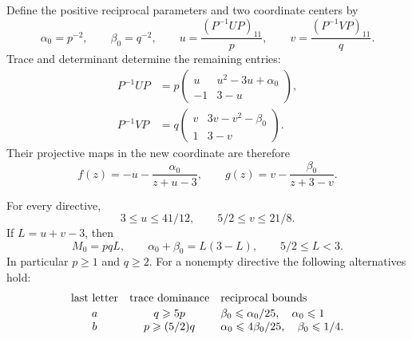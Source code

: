 Define the positive reciprocal parameters and two coordinate centers by
$$
 \alpha_0=p^{-2},\qquad\beta_0=q^{-2},\qquad
 u=\frac{(P^{-1}UP)_{11}}p,\qquad
 v=\frac{(P^{-1}VP)_{11}}q.
$$
Trace and determinant determine the remaining entries:
\begin{equation}\label{eq:decoder-cusp-matrices}
 \begin{split}
 P^{-1}UP&=
 p\begin{pmatrix}u&u^2-3u+\alpha_0\\-1&3-u\end{pmatrix},\\
 P^{-1}VP&=
 q\begin{pmatrix}v&3v-v^2-\beta_0\\1&3-v\end{pmatrix}.
 \end{split}
\end{equation}
Their projective maps in the new coordinate are therefore
\begin{equation}\label{eq:decoder-fg}
 f(z)=-u-\frac{\alpha_0}{z+u-3},\qquad
 g(z)=v-\frac{\beta_0}{z+3-v}.
\end{equation}

\begin{lemma}
\label{lem:decoder-dominance}
For every directive,
\begin{equation}\label{eq:decoder-uv}
 3\leqslant u\leqslant41/12,\qquad
 5/2\leqslant v\leqslant21/8.
\end{equation}
If $L=u+v-3$, then
\begin{equation}\label{eq:decoder-curve}
 M_0=pqL,\qquad
 \alpha_0+\beta_0=L(3-L),\qquad 5/2\leqslant L<3.
\end{equation}
In particular $p\geqslant1$ and $q\geqslant2$. For a nonempty
directive the following alternatives hold:
\begin{equation}\label{eq:decoder-dominance}
 \begin{array}{c@{\quad}c@{\quad}l}
 \text{last letter}&\text{trace dominance}&\text{reciprocal bounds}\\[2pt]
 a&q\geqslant5p&\beta_0\leqslant\alpha_0/25,\quad\alpha_0\leqslant1\\
 b&p\geqslant(5/2)q&\alpha_0\leqslant4\beta_0/25,\quad\beta_0\leqslant1/4.
 \end{array}
\end{equation}
\end{lemma}

